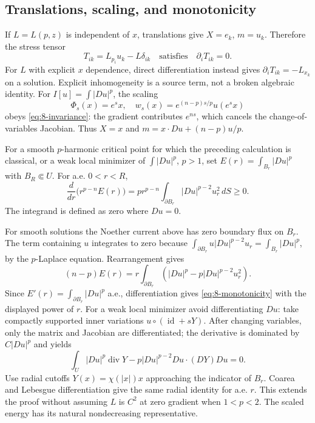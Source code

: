 \Needspace{45mm}
\subsection{Translations, scaling, and monotonicity}
If $L=L(p,z)$ is independent of $x$, translations give
$X=e_k$, $m=u_k$. Therefore the stress tensor
\[
 T_{ik}=L_{p_i}u_k-L\delta_{ik}
 \quad\text{satisfies}\quad\partial_iT_{ik}=0.
\]
For $L$ with explicit $x$ dependence, direct differentiation instead gives
$\partial_iT_{ik}=-L_{x_k}$ on a solution. Explicit inhomogeneity is a
source term, not a broken algebraic identity.
For $I[u]=\int|Du|^p$, the scaling
\[
 \Phi_s(x)=e^sx,\quad
 w_s(x)=e^{(n-p)s/p}u(e^sx)
\]
obeys \eqref{eq:8-invariance}: the gradient contributes $e^{ns}$,
which cancels the change-of-variables Jacobian.
Thus $X=x$ and $m=x\cdot Du+(n-p)u/p$.
\Needspace{55mm}
\begin{theorem}
For a smooth $p$-harmonic critical point for which the preceding calculation
is classical, or a weak local minimizer of $\int|Du|^p$, $p>1$, set
$E(r)=\int_{B_r}|Du|^p$ with $B_R\Subset U$. For a.e. $0<r<R$,
\begin{equation}\label{eq:8-monotonicity}
 \frac d{dr}\big(r^{p-n}E(r)\big)
 =p r^{p-n}\int_{\partial B_r}|Du|^{p-2}u_r^2\,dS\geq0.
\end{equation}
The integrand is defined as zero where $Du=0$.
\end{theorem}
\begin{expandedproof}
For smooth solutions the Noether current above has zero boundary flux
on $B_r$. The term containing $u$ integrates to zero because
$\int_{\partial B_r}u|Du|^{p-2}u_r=\int_{B_r}|Du|^p$,
by the $p$-Laplace equation. Rearrangement gives
\[
 (n-p)E(r)=r\int_{\partial B_r}
       (|Du|^p-p|Du|^{p-2}u_r^2).
\]
Since $E'(r)=\int_{\partial B_r}|Du|^p$ a.e., differentiation gives
\eqref{eq:8-monotonicity} with the displayed power of $r$.
For a weak local minimizer avoid differentiating $Du$: take compactly
supported inner variations $u\circ(\operatorname{id}+sY)$.
After changing variables, only the matrix and Jacobian are differentiated;
the derivative is dominated by $C|Du|^p$ and yields
\[
 \int_U |Du|^p\operatorname{div}Y
       -p|Du|^{p-2}Du\cdot(DY)Du=0.
\]
Use radial cutoffs $Y(x)=\chi(|x|)x$ approaching the indicator of $B_r$.
Coarea and Lebesgue differentiation give the same radial identity for a.e.
$r$. This extends the proof without assuming $L$ is $C^2$ at zero gradient
when $1<p<2$. The scaled energy has its natural nondecreasing representative.
\end{expandedproof}
\Needspace{55mm}

